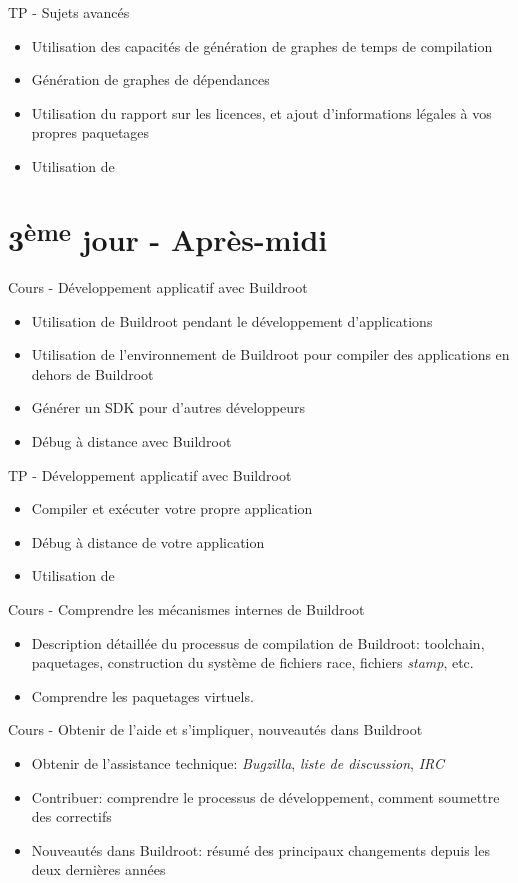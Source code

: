 \documentclass[a4paper,12pt,obeyspaces,spaces,hyphens]{article}
\begin{document}
\feagendaonecolumn
{TP - Sujets avancés}
{
  \begin{itemize}
  \item Utilisation des capacités de génération de graphes de temps de
	compilation
  \item Génération de graphes de dépendances
  \item Utilisation du rapport sur les licences, et ajout d'informations
	légales à vos propres paquetages 
  \item Utilisation de 
  \end{itemize}
}

\section{3\textsuperscript{ème} jour - Après-midi}

\feagendatwocolumn
{Cours - Développement applicatif avec Buildroot}
{
  \begin{itemize}
  \item Utilisation de Buildroot pendant le développement d'applications
  \item Utilisation de l'environnement de Buildroot pour compiler des
	applications en dehors de Buildroot
  \item Générer un SDK pour d'autres développeurs
  \item Débug à distance avec Buildroot
  \end{itemize}
}
{TP - Développement applicatif avec Buildroot}
{
  \begin{itemize}
  \item Compiler et exécuter votre propre application
  \item Débug à distance de votre application
  \item Utilisation de 
  \end{itemize}
}

\feagendatwocolumn
{Cours - Comprendre les mécanismes internes de Buildroot}
{
  \begin{itemize}
  \item Description détaillée du processus de compilation de Buildroot:
    	toolchain, paquetages, construction du système de fichiers race,
	fichiers {\em stamp}, etc.
  \item Comprendre les paquetages virtuels.
  \end{itemize}
}
{Cours - Obtenir de l'aide et s'impliquer, nouveautés dans Buildroot}
{
  \begin{itemize}
  \item Obtenir de l'assistance technique: {\em Bugzilla}, {\em liste de
	discussion}, {\em IRC}
  \item Contribuer: comprendre le processus de développement, comment
    soumettre des correctifs
  \item Nouveautés dans Buildroot: résumé des principaux changements
    depuis les deux dernières années
  \end{itemize}
}
\end{document}

